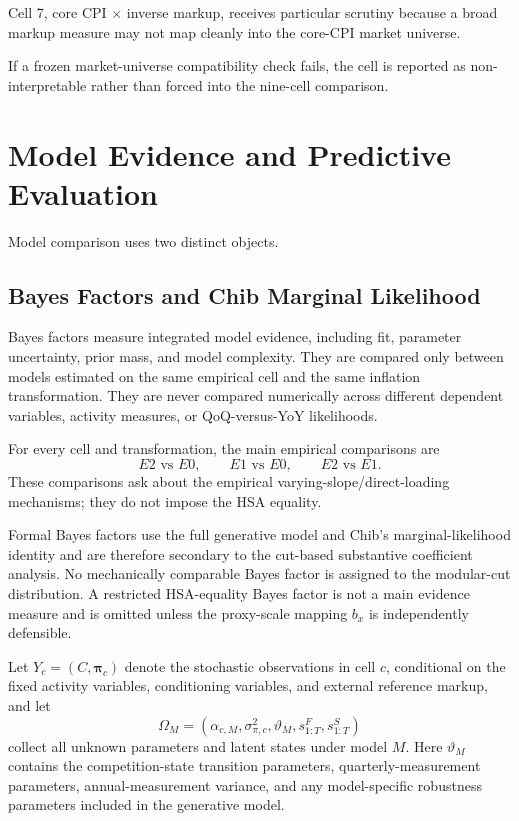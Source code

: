 \documentclass[11pt]{article}
\begin{document}
Cell 7, core CPI \(\times\) inverse markup, receives particular scrutiny because a broad markup measure may not map cleanly into the core-CPI market universe.

If a frozen market-universe compatibility check fails, the cell is reported as non-interpretable rather than forced into the nine-cell comparison.

\section{Model Evidence and Predictive Evaluation}

Model comparison uses two distinct objects.

\subsection{Bayes Factors and Chib Marginal Likelihood}

Bayes factors measure integrated model evidence, including fit, parameter uncertainty, prior mass, and model complexity. They are compared only between models estimated on the same empirical cell and the same inflation transformation. They are never compared numerically across different dependent variables, activity measures, or QoQ-versus-YoY likelihoods.

For every cell and transformation, the main empirical comparisons are
\begin{equation}
E2\text{ vs }E0,
\qquad
E1\text{ vs }E0,
\qquad
E2\text{ vs }E1.
\end{equation}
These comparisons ask about the empirical varying-slope/direct-loading mechanisms; they do not impose the HSA equality.

Formal Bayes factors use the full generative model and Chib's marginal-likelihood identity and are therefore secondary to the cut-based substantive coefficient analysis. No mechanically comparable Bayes factor is assigned to the modular-cut distribution. A restricted HSA-equality Bayes factor is not a main evidence measure and is omitted unless the proxy-scale mapping $b_x$ is independently defensible.

Let \(Y_c=(C,\bm\pi_c)\) denote the stochastic observations in cell \(c\), conditional on the fixed activity variables, conditioning variables, and external reference markup, and let
\begin{equation}
\Omega_M
=
\left(
\alpha_{c,M},
\sigma_{\pi,c}^2,
\vartheta_M,
s_{1:T}^F,
s_{1:T}^S
\right)
\end{equation}
collect all unknown parameters and latent states under model \(M\). Here \(\vartheta_M\) contains the competition-state transition parameters, quarterly-measurement parameters, annual-measurement variance, and any model-specific robustness parameters included in the generative model.
\end{document}
